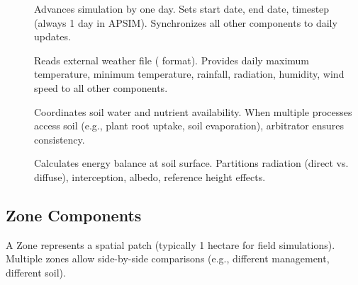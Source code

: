 \begin{description}
  \item[] Advances simulation by one day. Sets start date, end date, timestep (always 1 day in APSIM). Synchronizes all other components to daily updates.
  
  \item[] Reads external weather file ( format). Provides daily maximum temperature, minimum temperature, rainfall, radiation, humidity, wind speed to all other components.
  
  \item[] Coordinates soil water and nutrient availability. When multiple processes access soil (e.g., plant root uptake, soil evaporation), arbitrator ensures consistency.
  
  \item[] Calculates energy balance at soil surface. Partitions radiation (direct vs. diffuse), interception, albedo, reference height effects.
\end{description}

\subsection{Zone Components}

A Zone represents a spatial patch (typically 1 hectare for field simulations). Multiple zones allow side-by-side comparisons (e.g., different management, different soil).

